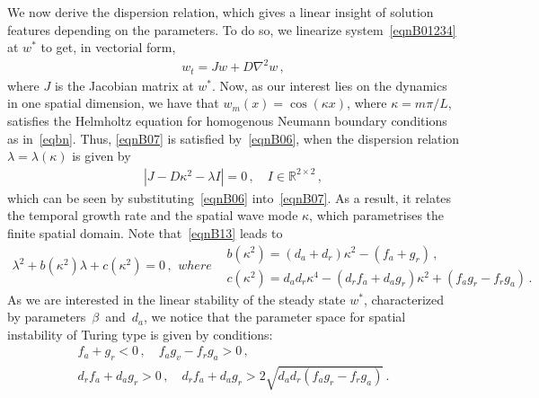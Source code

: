 \documentclass[%
 preprint,
 aip, 
 amsmath,amssymb,
]{revtex4-2}
\begin{document}
We now derive the dispersion relation, which gives a linear insight of solution features depending on the parameters. To do so, we linearize system~\eqref{eqnB01234} at $w^*$ to get, in vectorial form,
	\begin{gather}\label{eqnB07}
	w_t = Jw + D \nabla^2 w	\,,
	\end{gather}
	where $J$ is the Jacobian matrix at $w^*$. Now, as our interest lies on the dynamics in one spatial dimension, we have that $w_m(x)=\cos(\kappa x)$, where $\kappa=m\pi/L$, satisfies the Helmholtz equation for homogenous Neumann boundary conditions as in~\eqref{eqbn}. Thus, \eqref{eqnB07} is satisfied by~\eqref{eqnB06}, when the dispersion relation $\lambda=\lambda(\kappa)$ is given by
	\begin{gather}\label{eqnB13}
	|J-D\kappa^2-\lambda I|=0\,, \quad I\in\mathbb{R}^{2\times2}\,,
	\end{gather}
	which can be seen by substituting~\eqref{eqnB06} into~\eqref{eqnB07}. As a result, it relates the temporal growth rate and the spatial wave mode $\kappa$, which parametrises the finite spatial domain. Note that~\eqref{eqnB13} leads to 
	\begin{subequations}\label{eq:lambda}
		\begin{gather}\label{eqnB14}
		\lambda^2 + b(\kappa^2)\lambda + c(\kappa^2) =0\,,
		\end{gather}
		where
		\begin{flalign}
		& b(\kappa^2)=(d_a+d_r)\kappa^2 -(f_a+g_r)\,, \label{eqnB15} \\
		& c(\kappa^2)=d_ad_r\kappa^4-(d_rf_a+d_ag_r)\kappa^2+ (f_ag_r-f_rg_a) \,.\label{eqnB16}
		\end{flalign}
	\end{subequations}
As we are interested in the linear stability of the steady state $w^*$, characterized by parameters~$\beta$~and~$d_a$, we notice that the parameter space for spatial instability of Turing type is given by conditions: 
\begin{subequations} \label{eqnB17}
	\begin{gather}
	f_a+g_r<0\,, \quad f_ag_v-f_rg_a>0 \,, \label{eqnB18} \\
	d_rf_a + d_ag_r > 0 \,, \quad d_rf_a + d_ag_r > 2\sqrt{d_ad_r(f_ag_r-f_rg_a)} \,. \label{eqnB20}%
	\end{gather}
\end{subequations} 
\end{document}

